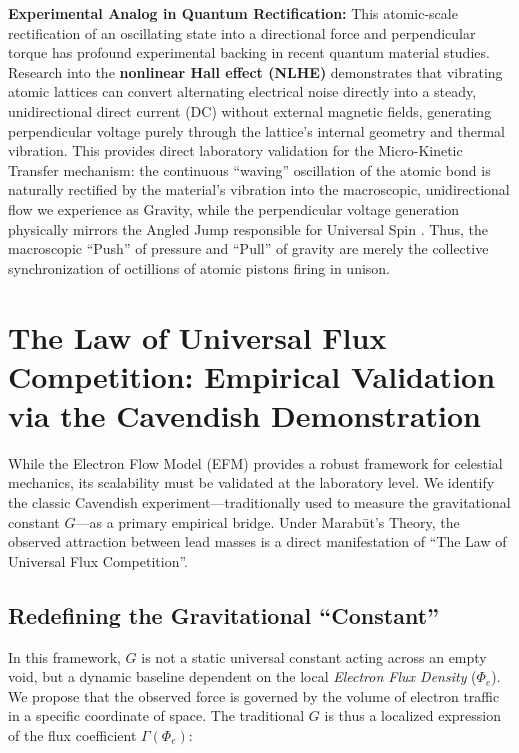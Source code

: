 \documentclass[11pt, a4paper]{article}
\begin{document}
\textbf{Experimental Analog in Quantum Rectification:} This atomic-scale rectification of an oscillating state into a directional force and perpendicular torque has profound experimental backing in recent quantum material studies. Research into the \textbf{nonlinear Hall effect (NLHE)} demonstrates that vibrating atomic lattices can convert alternating electrical noise directly into a steady, unidirectional direct current (DC) without external magnetic fields, generating perpendicular voltage purely through the lattice's internal geometry and thermal vibration. This provides direct laboratory validation for the Micro-Kinetic Transfer mechanism: the continuous ``waving'' oscillation of the atomic bond is naturally rectified by the material's vibration into the macroscopic, unidirectional flow we experience as Gravity, while the perpendicular voltage generation physically mirrors the Angled Jump responsible for Universal Spin \cite{sodemann2015}. Thus, the macroscopic ``Push'' of pressure and ``Pull'' of gravity are merely the collective synchronization of octillions of atomic pistons firing in unison.

\section{The Law of Universal Flux Competition: Empirical Validation via the Cavendish Demonstration}

While the Electron Flow Model (EFM) provides a robust framework for celestial mechanics, its scalability must be validated at the laboratory level. We identify the classic Cavendish experiment—traditionally used to measure the gravitational constant $G$—as a primary empirical bridge. Under Marab\={u}t's Theory, the observed attraction between lead masses is a direct manifestation of ``The Law of Universal Flux Competition''.

\subsection{Redefining the Gravitational ``Constant''}
In this framework, $G$ is not a static universal constant acting across an empty void, but a dynamic baseline dependent on the local \textit{Electron Flux Density} ($\Phi_e$). We propose that the observed force is governed by the volume of electron traffic in a specific coordinate of space. The traditional $G$ is thus a localized expression of the flux coefficient $\Gamma(\Phi_e)$:
\end{document}

